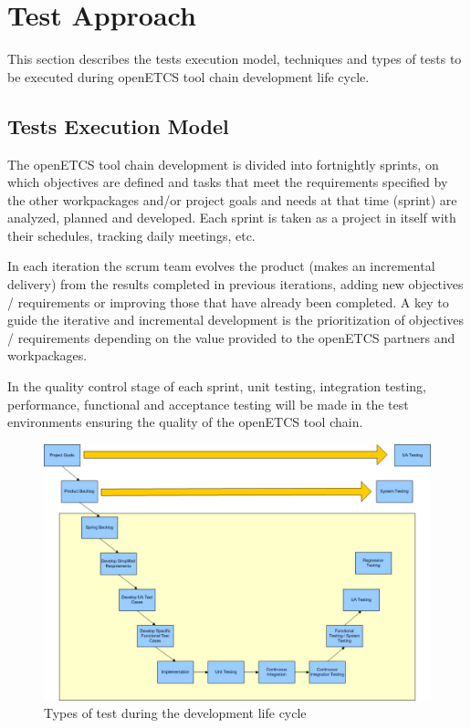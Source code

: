 \section{Test Approach}
\label{sec:test_stra}

This section describes the tests execution model, techniques and types of tests to be executed during openETCS tool chain development life cycle.

\subsection{Tests Execution Model}
The openETCS tool chain development is divided into  fortnightly sprints, on which objectives are defined and tasks that meet the requirements specified by the other workpackages and/or project goals and needs at that time (sprint) are analyzed, planned and developed. Each sprint is taken as a project in itself with their schedules, tracking daily meetings, etc.

In each iteration the scrum team evolves the product (makes an incremental delivery) from the results completed in previous iterations, adding new objectives / requirements or improving those that have already been completed. A key to guide the iterative and incremental development is the prioritization of objectives / requirements depending on the value provided to the openETCS partners and workpackages.

In the quality control stage of each sprint, unit testing, integration testing, performance, functional and acceptance testing will be made in the test environments ensuring the quality of the openETCS tool chain.

\begin{figure}[htbp]
\includegraphics[width=\textwidth]{types_test}
\caption{\label{fig:types} Types of test during the development life cycle} 
\end{figure}


